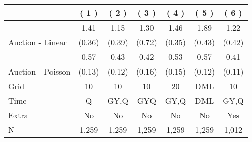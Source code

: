 
\begin{tabular}{lcccccc}
\toprule
  & ( 1 ) & ( 2 ) & ( 3 ) & ( 4 ) & ( 5 ) & ( 6 )\\
\midrule
 & 1.41 & 1.15 & 1.30 & 1.46 & 1.89 & 1.22\\

\multirow{-2}{*}{\raggedright\arraybackslash Auction - Linear} & (0.36) & (0.39) & (0.72) & (0.35) & (0.43) & (0.42)\\

\midrule
 & 0.57 & 0.43 & 0.42 & 0.53 & 0.57 & 0.41\\

\multirow{-2}{*}{\raggedright\arraybackslash Auction - Poisson} & (0.13) & (0.12) & (0.16) & (0.15) & (0.12) & (0.11)\\

\midrule
Grid & 10 & 10 & 10 & 20 & DML & 10\\

Time & Q & GY,Q & GYQ & GY,Q & DML & GY,Q\\

Extra & No & No & No & No & No & Yes\\

N & 1,259 & 1,259 & 1,259 & 1,259 & 1,259 & 1,012\\
\bottomrule
\end{tabular}
